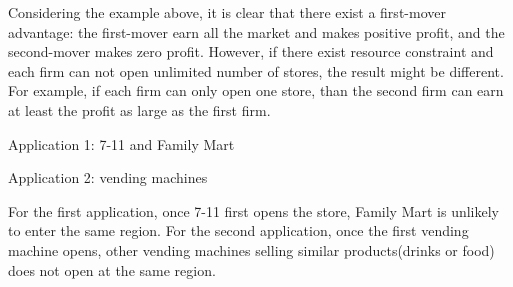 \documentclass[a4paper]{article}
\begin{document}
    \begin{answer}[Q5]
    Considering the example above, it is clear that there exist a first-mover advantage: the first-mover earn all the market and makes positive profit, and the second-mover makes zero profit. However, if there exist resource constraint and each firm can not open unlimited number of stores, the result might be different. For example, if each firm can only open one store, than the second firm can earn at least the profit as large as the first firm.
    \end{answer}
    
    \begin{answer}[Q6]
    
    Application 1: 7-11 and Family Mart
    
    Application 2: vending machines
    
    For the first application, once 7-11 first opens the store,
    Family Mart is unlikely to enter the same region.
    For the second application, once the first vending machine opens, other vending machines selling similar products(drinks or food) does not open at the same region.
    \end{answer}
    
    
\end{document}
